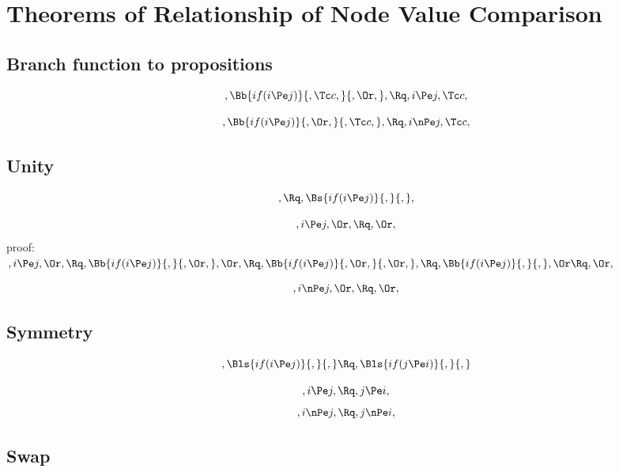 
\chapter{Theorems of Relationship of Node Value Comparison}
\section{Branch function to propositions}
\[,\Bb{if(i \Pe j)}{,\Tc c,}{,\Or,}, \Rq ,i \Pe j, \Tc c,\]

\bigskip
\bigskip
\[,\Bb{if(i \Pe j)}{,\Or,}{,\Tc c,}, \Rq ,i \nPe j, \Tc c,\]



\bigskip
\bigskip
\bigskip
\bigskip

\section{ Unity}
\[, \Rq , \Bs{if(i \Pe j)}{,}{,},\]

\[, i \Pe j, \Or, \Rq , \Or,\]
\bigskip
\bigskip
\bigskip
\bigskip
proof:\\
\begin{math} 
, i \Pe j, \Or, \\\\\\
\Rq,  \Bb{if(i \Pe j)}{,}{,\Or,}, \Or,\\\\\\
\Rq,  \Bb{if(i \Pe j)}{, \Or,}{,\Or,},\\\\\\
\Rq,  \Bb{if(i \Pe j)}{,}{,},\Or\\\\\\
\Rq, \Or,
\end{math}


\[, i \nPe j, \Or, \Rq , \Or,\]



\bigskip
\bigskip
\bigskip
\bigskip
\section{ Symmetry}
\[, \Bls{if(i \Pe j)}{,}{,} \Rq , \Bls{if(j \Pe i)}{,}{,} \]

\[, i \Pe j, \Rq , j \Pe i,\]
\[, i \nPe j, \Rq , j \nPe i,\]


\bigskip
\bigskip
\bigskip
\bigskip
\section{ Swap}
